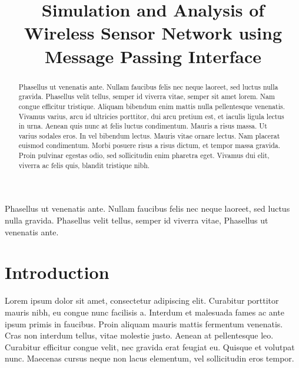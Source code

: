 \documentclass[conference]{IEEEtran}
\begin{document}
	
	\title{Simulation and Analysis of Wireless Sensor Network using Message Passing Interface }
	
	\author{
		}
	\maketitle
	
	\begin{abstract}
		Phasellus ut venenatis ante. Nullam faucibus felis nec neque laoreet, sed luctus nulla gravida. Phasellus velit tellus, semper id viverra vitae, semper sit amet lorem. Nam congue efficitur tristique. Aliquam bibendum enim mattis nulla pellentesque venenatis. Vivamus varius, arcu id ultricies porttitor, dui arcu pretium est, et iaculis ligula lectus in urna. Aenean quis nunc at felis luctus condimentum. Mauris a risus massa. Ut varius sodales eros. In vel bibendum lectus. Mauris vitae ornare lectus. Nam placerat euismod condimentum. Morbi posuere risus a risus dictum, et tempor massa gravida. Proin pulvinar egestas odio, sed sollicitudin enim pharetra eget. Vivamus dui elit, viverra ac felis quis, blandit tristique nibh.
	\end{abstract}

	
	\begin{IEEEkeywords}
		Phasellus ut venenatis ante. Nullam faucibus felis nec neque laoreet, sed luctus nulla gravida. Phasellus velit tellus, semper id viverra vitae, Phasellus ut venenatis ante. 
	\end{IEEEkeywords}
	
	\section{Introduction}
	
	Lorem ipsum dolor sit amet, consectetur adipiscing elit. Curabitur porttitor mauris nibh, eu congue nunc facilisis a. Interdum et malesuada fames ac ante ipsum primis in faucibus. Proin aliquam mauris mattis fermentum venenatis. Cras non interdum tellus, vitae molestie justo. Aenean at pellentesque leo. Curabitur efficitur congue velit, nec gravida erat feugiat eu. Quisque et volutpat nunc. Maecenas cursus neque non lacus elementum, vel sollicitudin eros tempor.
	
\end{document}
